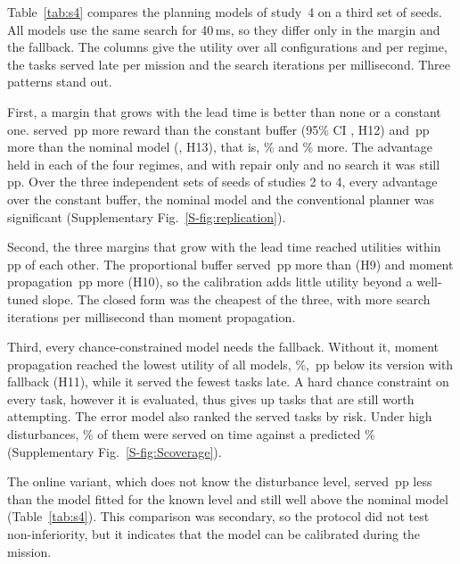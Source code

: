 Table~\ref{tab:s4} compares the planning models of study~4 on a third set of seeds. All models use the same search for
40\,ms, so they differ only in the margin and the fallback. The columns give the utility over all configurations and
per regime, the tasks served late per mission and the search iterations per millisecond. Three patterns stand out.

First, a margin that grows with the lead time is better than none or a constant one. \mname{} served
\,pp more reward than the constant buffer (95\% CI , H12) and \,pp
more than the nominal model (, H13), that is, \% and \% more. The
advantage held in each of the four regimes, and with repair only and no search it was still \,pp.
Over the three independent sets of seeds of studies 2 to 4, every advantage over the constant buffer, the nominal model
and the conventional planner was significant (Supplementary Fig.~\ref{S-fig:replication}).

Second, the three margins that grow with the lead time reached utilities within \,pp of each other.
The proportional buffer served \,pp more than \mname{} (H9) and moment propagation
\,pp more (H10), so the calibration adds little utility beyond a well-tuned slope. The closed form was
the cheapest of the three, with  more search iterations per millisecond than moment propagation.

Third, every chance-constrained model needs the fallback. Without it, moment propagation reached the lowest utility of
all models, \%, \,pp below its version with fallback (H11), while it served the fewest
tasks late. A hard chance constraint on every task, however it is evaluated, thus gives up tasks that are still worth
attempting. The error model also ranked the served tasks by risk. Under high disturbances, \% of
them were served on time against a predicted \% (Supplementary Fig.~\ref{S-fig:Scoverage}).

The online variant, which does not know the disturbance level, served \,pp less than the model
fitted for the known level and still well above the nominal model (Table~\ref{tab:s4}). This comparison was secondary,
so the protocol did not test non-inferiority, but it indicates that the model can be calibrated during the mission.

